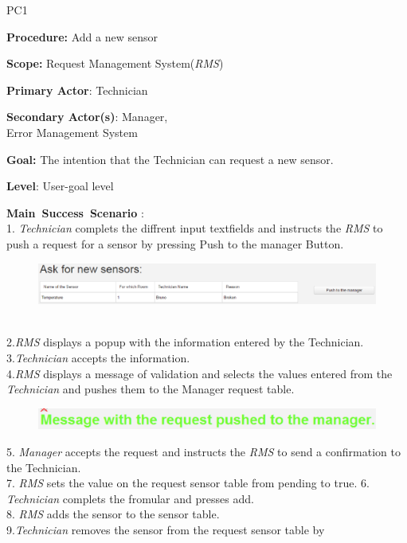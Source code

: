 \begin{lyxlist}{PC1}
\small{
\item [\textbf{Procedure:}] Add a new sensor
\item [\textbf{Scope:}] Request Management System(\emph{RMS})
\item [\textbf{Primary Actor}:] Technician
\item [\textbf{Secondary Actor(s)}:] Manager,\\
 Error Management System
\item [\textbf{Goal:}] The intention that the Technician can request a new
sensor.
\item [\textbf{Level}:] User-goal level
\item [\textbf{Main~Success~Scenario}]:\\
1. \emph{Technician} complets the diffrent input textfields and instructs the
\emph{RMS} to push a request for a sensor by pressing Push to the manager Button.
\begin{figure}
\includegraphics[width=1\textwidth]{images/AskForNewSensor.eps}
\end{figure} \\
2.\emph{RMS} displays a popup with the information entered by the Technician.\\
3.\emph{Technician} accepts the information.\\
4.\emph{RMS} displays a message of validation and selects the values entered
from the \emph{Technician} and pushes them to the Manager request table.\\
 \begin{figure}
\includegraphics[width=1\textwidth]{images/RequestAskForNewSensor.eps}
\end{figure}
5. \emph{Manager} accepts the request and instructs the \emph{RMS} to send a
confirmation to the Technician.\\
7. \emph{RMS} sets the value on the request sensor table from pending to true.
6. \emph{Technician} complets the fromular and presses add.\\
8. \emph{RMS} adds the sensor to the sensor table.\\
9.\emph{Technician} removes the sensor from the request sensor table by
}
\end{lyxlist}
